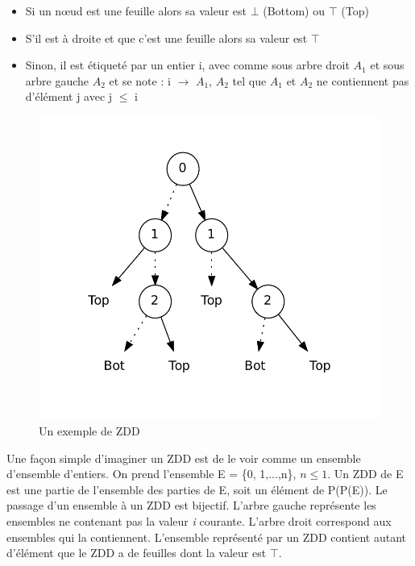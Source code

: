 \documentclass[a4paper]{article}
\begin{document}
\begin{itemize}
\item Si un n\oe ud est une feuille alors sa valeur est $\bot$ (Bottom) ou 
$\top$ (Top)
\item S'il est à droite et que c'est une feuille alors sa valeur est $\top$
\item Sinon, il est étiqueté par un entier i, avec comme sous arbre droit 
$A_1$ et sous arbre gauche $A_2$ et se note : i $\rightarrow$ $A_1$, $A_2$ tel
que $A_1$ et $A_2$ ne contiennent pas d'élément j avec j $\leq$ i \\
\end{itemize} 

\begin{figure}[htp]
\begin{center}
\includegraphics[scale=0.4]{../imports/zdd_ex.pdf}
\end{center}
\caption{\label{fig:zdd_exemple} Un exemple de ZDD}
\end{figure}

Une façon simple d'imaginer un ZDD est de le voir comme un ensemble d'ensemble 
d'entiers. 
On prend l'ensemble E = \{0, 1,...,n\}, $n \leq 1$. Un ZDD de E est une partie de 
l'ensemble 
des parties de E, soit un élément de P(P(E)). Le passage d'un ensemble à un ZDD
est bijectif. L'arbre gauche représente les ensembles ne contenant 
pas la valeur
\emph{i} courante. L'arbre droit correspond aux ensembles qui la contiennent.
L'ensemble représenté par un ZDD contient autant d'élément que le ZDD 
a de feuilles 
dont la valeur est $\top$.
\end{document}
